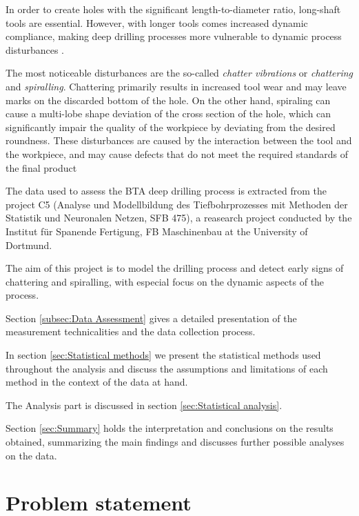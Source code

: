 \documentclass[12 pt]{scrartcl}
\numberwithin{equation}{section}
\begin{document}
In order to create holes with the significant length-to-diameter ratio,
long-shaft tools are essential. However, with longer tools comes increased dynamic compliance, 
making deep drilling processes more vulnerable to dynamic process disturbances \citep{webber2006investigations}.

The most noticeable disturbances are the so-called \textit{chatter vibrations} or \textit{chattering} and \textit{spiralling}.
Chattering primarily results in increased tool wear and may leave marks on the discarded bottom of the hole. 
On the other hand, spiraling can cause a multi-lobe shape deviation of the cross section of the hole, which can significantly impair the quality of the workpiece by deviating from the desired roundness.
These disturbances are caused by the interaction between the tool and the workpiece, 
and may cause defects that do not meet the required standards of the final product \citep{weinert2004time}

The data used to assess the BTA deep drilling process 
is extracted from the project C5 (Analyse und Modellbildung des Tiefbohrprozesses mit Methoden der Statistik und Neuronalen Netzen, SFB 475),
a reasearch project conducted by the Institut für Spanende Fertigung, FB Maschinenbau at the University of Dortmund.

The aim of this project is to model the drilling process and detect early signs of chattering and spiralling,
with especial focus on the dynamic aspects of the process. 

Section \ref{subsec:Data Assessment} gives a detailed presentation of the 
measurement technicalities and the data collection process.

In section \ref{sec:Statistical methods} 
we present the statistical methods used throughout the analysis
and discuss the assumptions and limitations of each method
in the context of the data at hand.

The Analysis part is discussed in section \ref{sec:Statistical analysis}.

Section \ref{sec:Summary} holds the interpretation and conclusions on the results obtained, 
summarizing the main findings and discusses further possible analyses on the data.



\section{Problem statement}
\label{sec:Problem statement}
\end{document}
